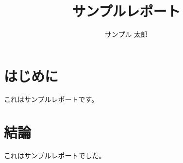 \documentclass[a4paper,10pt]{jarticle}
\title{サンプルレポート}
\author{サンプル 太郎}
\begin{document}
\maketitle
\pagestyle{empty}

\section{はじめに}

これはサンプルレポートです。

\section{結論}

これはサンプルレポートでした。



\end{document}

